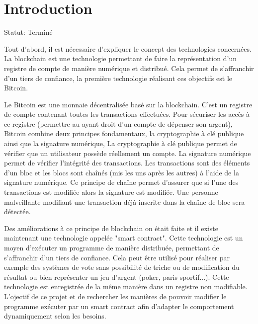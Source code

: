 \section{Introduction}

Statut: Terminé

Tout d’abord, il est nécessaire d’expliquer le concept des technologies concernées. La
blockchain est une technologie permettant de faire la représentation d’un registre de compte de
manière numérique et distribué. Cela permet de s’affranchir d’un tiers de confiance, la première
technologie réalisant ces objectifs est le Bitcoin. 

Le Bitcoin est une monnaie décentralisée basé sur
la blockchain. C'est un registre de compte contenant toutes les transactions effectuées. Pour sécuriser
les accès à ce registre (permettre au ayant droit d’un compte de dépenser son argent), Bitcoin
combine deux principes fondamentaux, la cryptographie à clé publique ainsi que la signature
numérique, La cryptographie à clé publique permet de vérifier que un utilisateur possède réellement
un compte. La signature numérique permet de vérifier l’intégrité des transactions. Les transactions
sont des éléments d’un bloc et les blocs sont chaînés (mis les uns après les autres) à l’aide de la
signature numérique. Ce principe de chaîne permet d’assurer que si l’une des transactions est
modifiée alors la signature est modifiée. Une personne malveillante modifiant une transaction déjà
inscrite dans la chaîne de bloc sera détectée.

Des améliorations à ce principe de blockchain on était faite et il existe maintenant une
technologie appelée "smart contract". Cette technologie est un moyen d’exécuter un programme
de manière distribuée, permettant de s’affranchir d’un tiers de confiance. Cela peut être utilisé pour
réaliser par exemple des systèmes de vote sans possibilité de triche ou de modification du résultat
ou bien représenter un jeu d’argent (poker, paris sportif...). Cette technologie est enregistrée de la
même manière dans un registre non modifiable. L’ojectif de ce projet et de rechercher les manières
de pouvoir modifier le programme exécuter par un smart contract afin d’adapter le comportement
dynamiquement selon les besoins.
